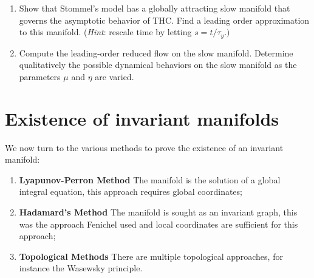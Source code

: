 \begin{exercise}
\begin{enumerate}
\item Show that Stommel's model has a globally attracting slow manifold
that governs the asymptotic behavior of THC. Find a leading order
approximation to this manifold. (\emph{Hint}: rescale time by letting
$s=t/\tau_{y}.)$
\item Compute the leading-order reduced flow on the slow manifold. Determine
qualitatively the possible dynamical behaviors on the slow manifold
as the parameters $\mu$ and $\eta$ are varied.
\end{enumerate}
\end{exercise}

\section{Existence of invariant manifolds}
We now turn to the various methods to prove the existence of an invariant manifold:
\begin{enumerate}
	\item \textbf{Lyapunov-Perron Method} The manifold is the solution of a global integral equation, this approach requires global coordinates;
	\item \textbf{Hadamard's Method} The manifold is sought as an invariant graph, this was the approach Fenichel used and local coordinates are sufficient for this approach;
	\item \textbf{Topological Methods} There are multiple topological approaches, for instance the Wasewsky principle.
\end{enumerate}

